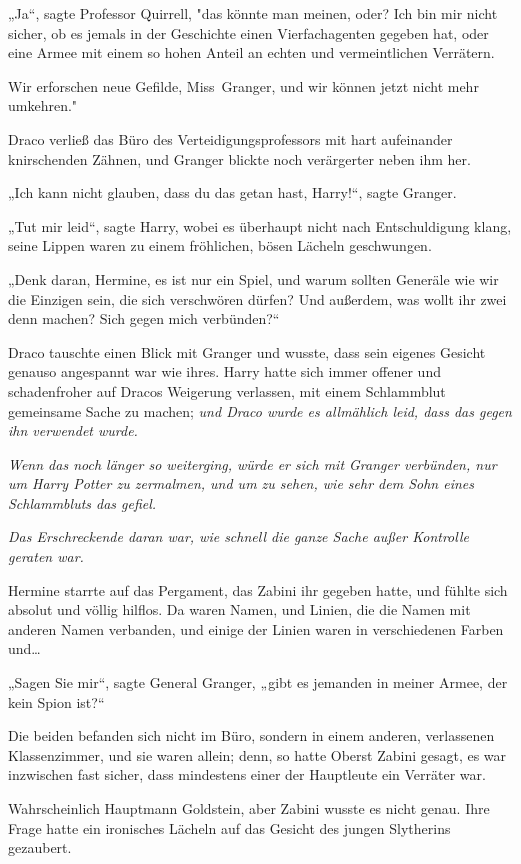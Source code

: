 {„Ja“, sagte Professor Quirrell, "das könnte man meinen, oder? Ich bin mir nicht sicher, ob es jemals in der Geschichte einen Vierfachagenten gegeben hat, oder eine Armee mit einem so hohen Anteil an echten und vermeintlichen Verrätern.

Wir erforschen neue Gefilde, Miss~Granger, und wir können jetzt nicht mehr umkehren."

Draco verließ das Büro des Verteidigungsprofessors mit hart aufeinander knirschenden Zähnen, und Granger blickte noch verärgerter neben ihm her.

„Ich kann nicht glauben, dass du das getan hast, Harry!“, sagte Granger.

„Tut mir leid“, sagte Harry, wobei es überhaupt nicht nach Entschuldigung klang, seine Lippen waren zu einem fröhlichen, bösen Lächeln geschwungen.

„Denk daran, Hermine, es ist nur ein Spiel, und warum sollten Generäle wie wir die Einzigen sein, die sich verschwören dürfen? Und außerdem, was wollt ihr zwei denn machen? Sich gegen mich verbünden?“

Draco tauschte einen Blick mit Granger und wusste, dass sein eigenes Gesicht genauso angespannt war wie ihres. Harry hatte sich immer offener und schadenfroher auf Dracos Weigerung verlassen, mit einem Schlammblut gemeinsame Sache zu machen; \emph{und Draco wurde es allmählich leid, dass das gegen ihn verwendet wurde.}

\emph{Wenn das noch länger so weiterging, würde er sich mit Granger verbünden, nur um Harry Potter zu zermalmen, und um zu sehen, wie sehr dem Sohn eines Schlammbluts das gefiel.}

\emph{Das Erschreckende daran war, wie schnell die ganze Sache außer Kontrolle geraten war.}

Hermine starrte auf das Pergament, das Zabini ihr gegeben hatte, und fühlte sich absolut und völlig hilflos. Da waren Namen, und Linien, die die Namen mit anderen Namen verbanden, und einige der Linien waren in verschiedenen Farben und…

„Sagen Sie mir“, sagte General Granger, „gibt es jemanden in meiner Armee, der kein Spion ist?“

Die beiden befanden sich nicht im Büro, sondern in einem anderen, verlassenen Klassenzimmer, und sie waren allein; denn, so hatte Oberst Zabini gesagt, es war inzwischen fast sicher, dass mindestens einer der Hauptleute ein Verräter war.

Wahrscheinlich Hauptmann Goldstein, aber Zabini wusste es nicht genau. Ihre Frage hatte ein ironisches Lächeln auf das Gesicht des jungen Slytherins gezaubert.

}
